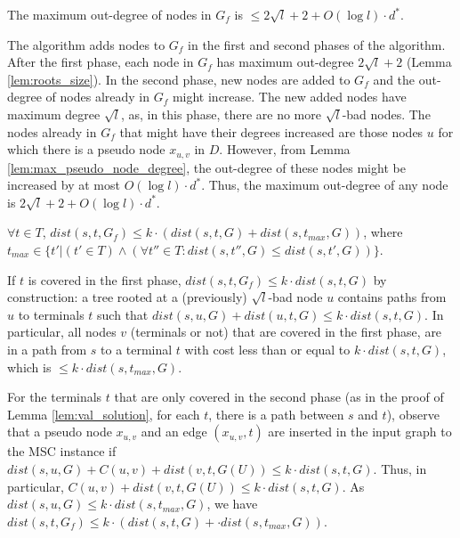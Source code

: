 \begin{Lem}
  \label{lem:max_degree}
  The maximum out-degree of nodes in $G_f$ is $\leq 2\sqrt{l} + 2 + O(\log l) \cdot d^*$.
\end{Lem}
  \begin{Proof}
The algorithm adds nodes to $G_f$ in the first and second phases of the algorithm. After the first phase, each node in $G_f$ has
maximum out-degree $2\sqrt{l} + 2$ (Lemma \ref{lem:roots_size}). In the second phase, new nodes are added to $G_f$ and the out-degree of
nodes already in $G_f$ might increase. The new added nodes have maximum degree $\sqrt{l}$, as, in this phase, there are no more $\sqrt{l}$-bad
nodes. The nodes already in $G_f$ that might have their degrees increased are those nodes $u$ for which there is a pseudo node $x_{u, v}$ in $D$. 
However, from Lemma \ref{lem:max_pseudo_node_degree}, the out-degree of these nodes might be increased by at most $O(\log l) \cdot d^*$. 
Thus, the maximum out-degree of any node is $2\sqrt{l} + 2 + O(\log l) \cdot d^*$.
  \end{Proof}

\begin{Lem}
  \label{lem:cost_guaranteed}
$\forall t \in T$, $dist(s,t,G_f) \leq k \cdot ( dist(s,t,G) + dist(s,t_{max},G))$, 
where $t_{max} \in \{t' | 
(t' \in T) \land (\forall t'' \in T : dist(s,t'',G) \le dist(s,t',G))\}$.
\end{Lem}
  \begin{Proof}
If $t$ is covered in the first phase, 
$dist(s, t, G_f) \le k \cdot dist(s,t,G)$ by construction: a tree rooted at a (previously) $\sqrt{l}$-bad node $u$ contains paths from $u$ to terminals $t$ such that 
$dist(s, u, G) + dist(u, t, G) \le k \cdot dist(s,t,G)$. In particular, all nodes $v$ (terminals or not) that are covered in the first phase, are in a path
from $s$ to a terminal $t$ with cost less than or equal to $k \cdot dist(s,t,G)$, which is $\le k \cdot dist(s,t_{max},G)$. 

For the terminals $t$ that are only covered in the second phase (as in the proof of Lemma \ref{lem:val_solution}, for each $t$, there is 
a path between $s$ and $t$), observe that
a pseudo node $x_{u, v}$ and an edge $(x_{u, v}, t)$ are inserted in the input graph to the MSC instance 
if $dist(s, u, G)+C(u,v)+dist(v,t,G(U)) \leq k \cdot dist(s,t,G)$. Thus, in particular, $C(u,v)+dist(v,t,G(U)) \le k \cdot dist(s,t,G)$.
As $dist(s, u, G) \le k \cdot dist(s,t_{max},G)$, we have
$dist(s,t,G_f) \leq k \cdot (dist(s,t,G) + \cdot dist(s,t_{max},G))$.
  \end{Proof}

